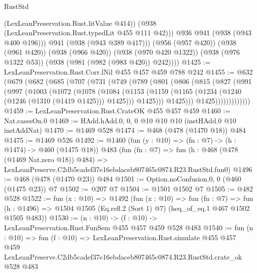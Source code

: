 \begin{lexlean}{RustStd}
\begin{coremodule}
                (LexLeanPreservation.Rust.litValue @414))
              (@938 (LexLeanPreservation.Rust.typedLit @455 @111 @42)))
            @936
            @941
            (@938 (@943 @400 @196)))
          @941
          (@938 (@943 @389 @417)))
        (@956 (@957 @420))
        (@938 (@961 @420))
        (@938 (@966 @420))
        (@938 (@970 @420 @1322))
        (@938 (@976 @1322 @53))
        (@938 (@981 (@982 (@983 @420)) @242))))
@1425 := LexLeanPreservation.Rust.Corr.lNil @455 @457 @459 @788 @242
@1455 := @632
    (@679
      (@682
        (@685
          (@707
            (@731
              (@749
                (@789
                  (@801
                    (@806
                      (@815
                        (@827
                          (@991
                            (@997
                              (@1003
                                (@1072
                                  (@1078
                                    (@1084
                                      (@1153
                                        (@1159
                                          (@1165
                                            (@1234 (@1240 (@1246 (@1310 (@1419 @1425))) @1425)))
                                          @1425)))
                                    @1425)))
                              @1425)))))))))))))
@1459 := LexLeanPreservation.Rust.CrateOK @455 @457 @459
@1460 := Nat.casesOn.{0}
@1469 := HAdd.hAdd.{0, 0, 0} @10 @10 @10 (instHAdd.{0} @10 instAddNat)
@1470 := @1469 @528
@1474 := @468 (@478 (@1470 @18)) @484
@1475 := @1469 @526
@1492 := @1460
    (fun (y : @10) => (fn : @7) -> (h : @1474) -> @460 (@1475 @18))
    @483
    (fun (fn : @7) =>
    fun (h : @468 (@478 (@1469 Nat.zero @18)) @484) =>
    LexLeanPreserve.C2db5cadef37e16ebdaceb807465c0874.R23.RustStd.fun0)
@1496 := @468 (@478 (@1470 @23)) @484
@1501 := Option.noConfusion.{0, 0} (@460 (@1475 @23)) @7
@1502 := @207 @7
@1504 := @1501 @1502 @7
@1505 := @482 @528
@1522 := fun (x : @10) =>
  @1492
    (fun (x : @10) =>
    fun (fn : @7) =>
    fun (h : @1496) => @1504 @1505 (Eq.refl.{2} (Sort 1) @7) (heq_of_eq.{1} @467 @1502 @1505 @483))
@1530 := (n : @10) -> (f : @10) -> LexLeanPreservation.Rust.FunSem @455 @457 @459 @528 @483
@1540 := fun (n : @10) =>
  fun (f : @10) =>
  LexLeanPreservation.Rust.simulate
    @455
    @457
    @459
    LexLeanPreserve.C2db5cadef37e16ebdaceb807465c0874.R23.RustStd.crate_ok
    @528
    @483
\end{coremodule}
\end{lexlean}
